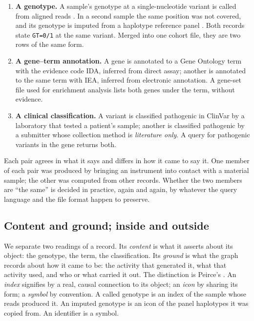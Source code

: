 \documentclass[11pt,twocolumn,a4paper]{article}
\theoremstyle{plain}
\theoremstyle{definition}
\theoremstyle{remark}
\begin{document}
\begin{enumerate}[label=(\roman*)]
\item \textbf{A genotype.} A sample's genotype at a single-nucleotide
  variant is called from aligned reads \citep{mckenna2010,danecek2021}. In a
  second sample the same position was not covered, and its genotype is imputed
  from a haplotype reference panel
  \citep{li2003,marchini2010,das2016,browning2016}. Both records state
  \texttt{GT=0/1} at the same variant. Merged into one cohort file, they are
  two rows of the same form.
\item \textbf{A gene--term annotation.} A gene is annotated to a Gene
  Ontology term \citep{ashburner2000,go2023} with the evidence code IDA,
  inferred from direct assay; another is annotated to the same term with IEA,
  inferred from electronic annotation. A gene-set file used for enrichment
  analysis \citep{subramanian2005,liberzon2011} lists both genes under the
  term, without evidence.
\item \textbf{A clinical classification.} A variant is classified
  pathogenic in ClinVar \citep{landrum2018} by a laboratory that tested a
  patient's sample; another is classified pathogenic by a submitter whose
  collection method is \emph{literature only}. A query for pathogenic variants
  in the gene returns both.
\end{enumerate}

Each pair agrees in what it says and differs in how it came to say it. One
member of each pair was produced by bringing an instrument into contact with a
material sample; the other was computed from other records. Whether the two
members are ``the same'' is decided in practice, again and again, by whatever
the query language and the file format happen to preserve.

\subsection{Content and ground; inside and outside}

We separate two readings of a record. Its \emph{content} is what it asserts
about its object: the genotype, the term, the classification. Its
\emph{ground} is what the graph records about how it came to be: the activity
that generated it, what that activity used, and who or what carried it out.
The distinction is Peirce's \citep{peirce_cp,peirce1906}. An \emph{index}
signifies by a real, causal connection to its object; an \emph{icon} by sharing
its form; a \emph{symbol} by convention. A called genotype is an index of the
sample whose reads produced it. An imputed genotype is an icon of the panel
haplotypes it was copied from. An identifier is a symbol.
\end{document}
